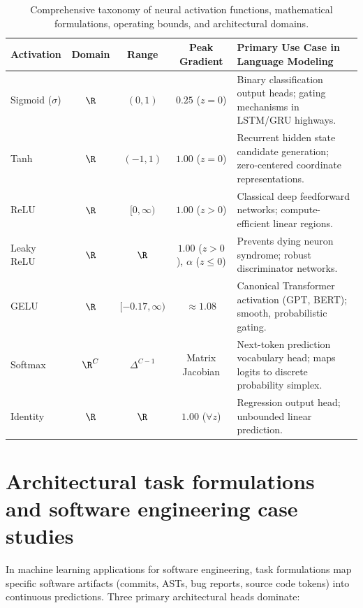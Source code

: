 \documentclass[../../main.tex]{subfiles}
\begin{document}
\begin{table}[htbp]
\centering
\small
\caption{Comprehensive taxonomy of neural activation functions, mathematical formulations, operating bounds, and architectural domains.}
\label{tab:activations_taxonomy}
\begin{tabularx}{\textwidth}{l c c c >{\raggedright\arraybackslash}X}
\toprule
\textbf{Activation} & \textbf{Domain} & \textbf{Range} & \textbf{Peak Gradient} & \textbf{Primary Use Case in Language Modeling} \\
\midrule
Sigmoid ($\sigma$) & $\R$ & $(0, 1)$ & $0.25$ ($z=0$) & Binary classification output heads; gating mechanisms in LSTM/GRU highways. \\
Tanh & $\R$ & $(-1, 1)$ & $1.00$ ($z=0$) & Recurrent hidden state candidate generation; zero-centered coordinate representations. \\
ReLU & $\R$ & $[0, \infty)$ & $1.00$ ($z > 0$) & Classical deep feedforward networks; compute-efficient linear regions. \\
Leaky ReLU & $\R$ & $\R$ & $1.00$ ($z > 0$), $\alpha$ ($z \le 0$) & Prevents dying neuron syndrome; robust discriminator networks. \\
GELU & $\R$ & $[-0.17, \infty)$ & $\approx 1.08$ & Canonical Transformer activation (GPT, BERT); smooth, probabilistic gating. \\
Softmax & $\R^C$ & $\Delta^{C-1}$ & Matrix Jacobian & Next-token prediction vocabulary head; maps logits to discrete probability simplex. \\
Identity & $\R$ & $\R$ & $1.00$ ($\forall z$) & Regression output head; unbounded linear prediction. \\
\bottomrule
\end{tabularx}
\end{table}


\section{Architectural task formulations and software engineering case studies}
\label{sec:task_formulations_se}

In machine learning applications for software engineering, task formulations map specific software artifacts (commits, ASTs, bug reports, source code tokens) into continuous predictions. Three primary architectural heads dominate:
\end{document}
